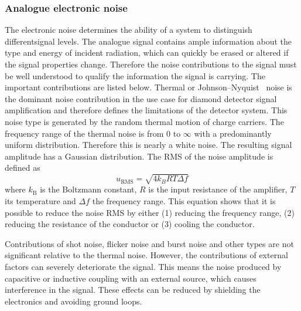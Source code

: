 \subsubsection{Analogue electronic noise}
The electronic noise determines the ability of a system to distinguish differentsignal levels. The analogue signal contains ample information about the type and energy of incident radiation, which can quickly be erased or altered if the signal properties change. Therefore the noise contributions to the signal must be well understood to qualify the information the signal is carrying. The important contributions are listed below. Thermal or Johnson--Nyquist~\cite{} noise is the dominant noise contribution in the use case for diamond detector signal amplification and therefore defines the limitations of the detector system. This noise type is generated by the random thermal motion of charge carriers. The frequency range of the thermal noise is from 0 to $\infty$ with a predominantly uniform distribution. Therefore this is nearly a white noise. The resulting signal amplitude has a Gaussian distribution. The RMS of the noise amplitude is defined as
\begin{equation}
\label{eq:thermnoise}
u_\mathrm{RMS}=\sqrt{4k_BRT\Delta f}
\end{equation}
where $k_\mathrm{B}$ is the Boltzmann constant, $R$ is the input resistance of the amplifier, $T$ its temperature and $\Delta f$ the frequency range. This equation shows that it is possible to reduce the noise RMS by either (1) reducing the frequency range, (2) reducing the resistance of the conductor or (3) cooling the conductor. 

Contributions of shot noise, flicker noise and burst noise and other types are not significant relative to the thermal noise. However, the contributions of external factors can severely deteriorate the signal. This means the noise produced by capacitive or inductive coupling with an external source, which causes interference in the signal. These effects can be reduced by shielding the electronics and avoiding ground loops. 

